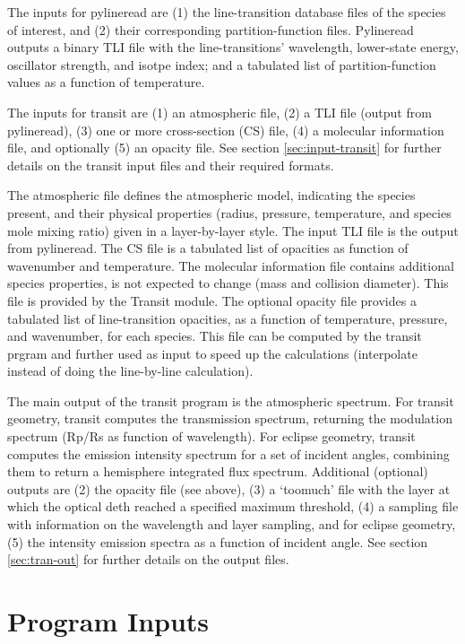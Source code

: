 \documentclass[letterpaper, 12pt]{article}
\begin{document}
The inputs for pylineread are (1) the line-transition database files
of the species of interest, and (2) their corresponding
partition-function files.  Pylineread outputs a binary TLI file with
the line-transitions' wavelength, lower-state energy, oscillator
strength, and isotpe index; and a tabulated list of partition-function
values as a function of temperature.

The inputs for transit are (1) an atmospheric file, (2) a TLI file
(output from pylineread), (3) one or more cross-section (CS) file,
(4) a molecular information file, and optionally (5) an opacity file.
See section \ref{sec:input-transit} for further details on the transit
input files and their required formats.

The atmospheric file defines the atmospheric model, indicating the
species present, and their physical properties (radius, pressure,
temperature, and species mole mixing ratio) given in a layer-by-layer
style.  The input TLI file is the output from pylineread.  The CS
file is a tabulated list of opacities as function of wavenumber
and temperature.  The molecular information file contains additional
species properties, is not expected to change (mass and collision
diameter).  This file is provided by the Transit module.  The optional
opacity file provides a tabulated list of line-transition opacities,
as a function of temperature, pressure, and wavenumber, for each
species.  This file can be computed by the transit prgram and further
used as input to speed up the calculations (interpolate instead of
doing the line-by-line calculation).

The main output of the transit program is the atmospheric spectrum.
For transit geometry, transit computes the transmission spectrum,
returning the modulation spectrum (Rp/Rs as function of wavelength).
For eclipse geometry, transit computes the emission intensity spectrum
for a set of incident angles, combining them to return a hemisphere
integrated flux spectrum.  Additional (optional) outputs are (2) the
opacity file (see above), (3) a `toomuch' file with the layer at which
the optical deth reached a specified maximum threshold, (4) a sampling
file with information on the wavelength and layer sampling, and for
eclipse geometry, (5) the intensity emission spectra as a function of
incident angle.  See section \ref{sec:tran-out} for further details on
the output files.


\section{Program Inputs}
\label{sec:inputs}
\end{document}

